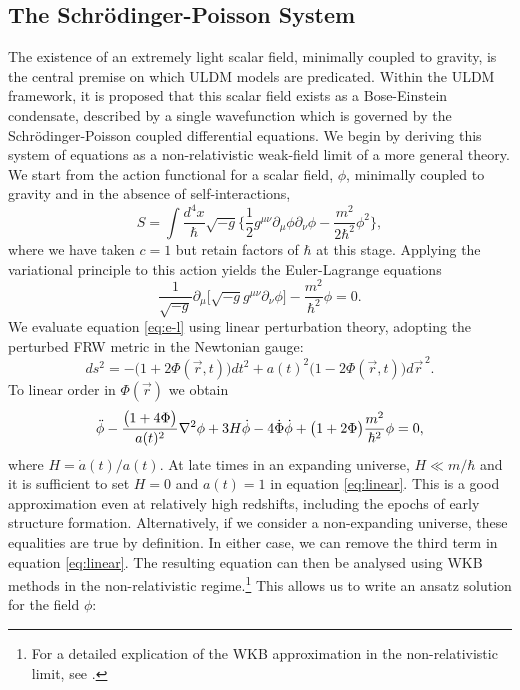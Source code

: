 \documentclass[a4paper,11pt]{article}
\begin{document}
\subsection{The Schr{\"o}dinger-Poisson System}

The existence of an extremely light scalar field, minimally coupled to gravity, is the central premise on which ULDM models are predicated. Within the ULDM framework, it is proposed that this scalar field exists as a Bose-Einstein condensate, described by a single wavefunction which is governed by the Schr{\"o}dinger-Poisson coupled differential equations. We begin by deriving this system of equations as a non-relativistic weak-field limit of a more general theory. We start from the action functional for a scalar field, $\phi$, minimally coupled to gravity and in the absence of self-interactions,
%
\begin{equation}\label{eq:action}
    S=\int \frac{d^4x}{\hbar}\sqrt{-g}\bigg\{\frac{1}{2}g^{\mu\nu}\partial_\mu\phi\partial_\nu\phi-\frac{m^2}{2\hbar^2}\phi^2\bigg\},
\end{equation}
%
where we have taken $c=1$ but retain factors of $\hbar$ at this stage. Applying the variational principle to this action yields the Euler-Lagrange equations
%
\begin{equation}\label{eq:e-l}
    \frac{1}{\sqrt{-g}}\partial_\mu\big[\sqrt{-g}g^{\mu\nu}\partial_\nu\phi\big]-\frac{m^2}{\hbar^2}\phi=0.
\end{equation}
We evaluate equation \ref{eq:e-l} using linear perturbation theory, adopting the perturbed FRW metric in the Newtonian gauge:
\begin{equation}\label{eq:pFRW}
    ds^2=-\big(1+2\Phi(\vec{r},t)\big)dt^2+a(t)^2\big(1-2\Phi(\vec{r},t)\big)d\vec{r}^{\,2}.
\end{equation}
To linear order in $\Phi(\vec{r})$ we obtain 
\begin{equation}\label{eq:linear}
    \Ddot{\phi}-\frac{\big(1+4\Phi\big)}{a(t)^2}\nabla^2\phi+3H\Dot{\phi}-4\dot{\Phi}\dot{\phi}+\big(1+2\Phi\big)\frac{m^2}{\hbar^2}\phi=0,
\end{equation}
where $H=\Dot{a}(t)/a(t)$. At late times in an expanding universe, $H\ll m/\hbar$ and it is sufficient to set $H=0$ and $a(t)=1$ in equation \ref{eq:linear}. This is a good approximation even at relatively high redshifts, including the epochs of early structure formation. Alternatively, if we consider a non-expanding universe, these equalities are true by definition. In either case, we can remove the third term in equation \ref{eq:linear}. The resulting equation can then be analysed using WKB methods in the non-relativistic regime.\footnote{For a detailed explication of the WKB approximation in the non-relativistic limit, see \cite{Young2015}.} This allows us to write an ansatz solution for the field $\phi$:
\end{document}
